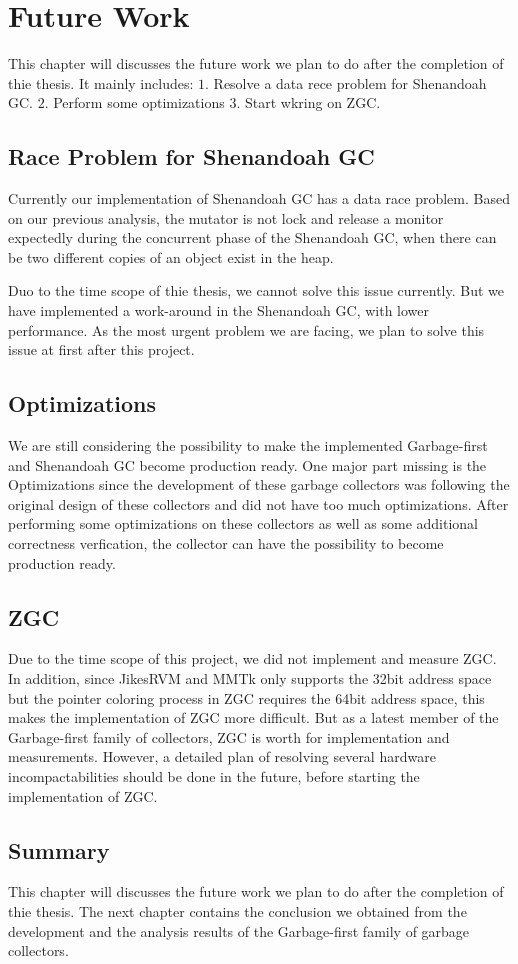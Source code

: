 \chapter{Future Work}
\label{cha:future}

This chapter will discusses the future work we plan to do after the completion
of thie thesis. It mainly includes:
$1.$ Resolve a data rece problem for Shenandoah GC.
$2.$ Perform some optimizations
$3.$ Start wkring on ZGC.

\section{Race Problem for Shenandoah GC}

Currently our implementation of Shenandoah GC has a data race problem.
Based on our previous analysis, the mutator is not lock and release a monitor
expectedly during the concurrent phase of the Shenandoah GC, when there can be
two different copies of an object exist in the heap.

Duo to the time scope of thie thesis, we cannot solve this issue currently.
But we have implemented a work-around in the Shenandoah GC, with lower performance.
As the most urgent problem we are facing, we plan to solve this issue at first after
this project.

\section{Optimizations}

We are still considering the possibility to make the implemented Garbage-first
and Shenandoah GC  become production ready. One major part missing is the Optimizations
since the development of these garbage collectors was following the original design
of these collectors and did not have too much optimizations. After performing some
optimizations on these collectors as well as some additional correctness verfication,
the collector can have the possibility to become production ready.

\section{ZGC}

Due to the time scope of this project, we did not implement and measure ZGC.
In addition, since JikesRVM and MMTk only supports the 32bit address space but the pointer
coloring process in ZGC requires the 64bit address space, this makes the implementation
of ZGC more difficult.
But as a latest member of the Garbage-first family of collectors, ZGC is
worth for implementation and measurements.
However, a detailed plan of resolving several hardware incompactabilities should be done in the future,
before starting the implementation of ZGC.

\section{Summary}

This chapter will discusses the future work we plan to do after the completion
of thie thesis. The next chapter contains the conclusion we obtained from the
development and the analysis results of the Garbage-first family of garbage collectors.